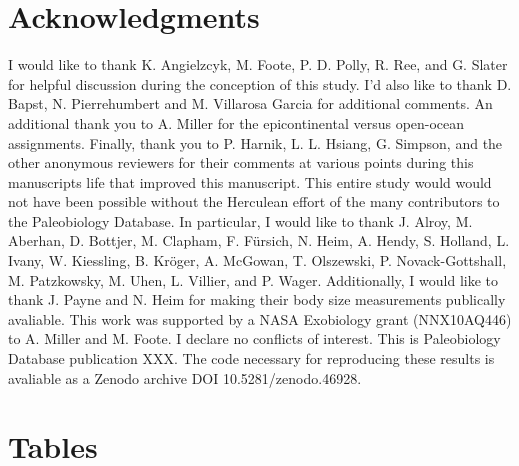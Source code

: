 \documentclass[11pt]{article}
\begin{document}
\section*{Acknowledgments}

I would like to thank K. Angielzcyk, M. Foote, P. D. Polly, R. Ree, and G. Slater for helpful discussion during the conception of this study. I'd also like to thank D. Bapst, N. Pierrehumbert and M. Villarosa Garcia for additional comments. An additional thank you to  A. Miller for the epicontinental versus open-ocean assignments. Finally, thank you to P. Harnik, L. L. Hsiang, G. Simpson, and the other anonymous reviewers for their comments at various points during this manuscripts life that improved this manuscript. This entire study would would not have been possible without the Herculean effort of the many contributors to the Paleobiology Database. In particular, I would like to thank J. Alroy, M. Aberhan, D. Bottjer, M. Clapham, F. F\"{u}rsich, N. Heim, A. Hendy, S. Holland, L. Ivany, W. Kiessling, B. Kr\"{o}ger, A. McGowan, T. Olszewski, P. Novack-Gottshall, M. Patzkowsky, M. Uhen, L. Villier, and P. Wager. Additionally, I would like to thank J. Payne and N. Heim for making their body size measurements publically avaliable. This work was supported by a NASA Exobiology grant (NNX10AQ446) to A. Miller and M. Foote. I declare no conflicts of interest. This is Paleobiology Database publication XXX. The code necessary for reproducing these results is avaliable as a Zenodo archive DOI 10.5281/zenodo.46928.

\newpage{}





\newpage

\section*{Tables}
\renewcommand{\thetable}{\arabic{table}}
\setcounter{table}{0}
\end{document}
